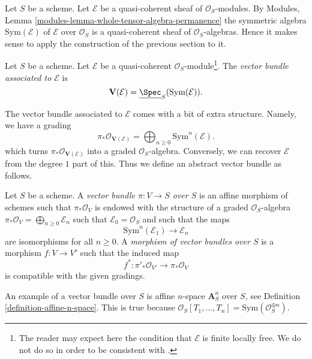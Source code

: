 \noindent
Let $S$ be a scheme.
Let $\mathcal{E}$ be a quasi-coherent sheaf of $\mathcal{O}_S$-modules.
By Modules, Lemma \ref{modules-lemma-whole-tensor-algebra-permanence}
the symmetric algebra $\text{Sym}(\mathcal{E})$ of
$\mathcal{E}$ over $\mathcal{O}_S$
is a quasi-coherent sheaf of $\mathcal{O}_S$-algebras.
Hence it makes sense to apply the construction of the
previous section to it.

\begin{definition}
\label{definition-vector-bundle}
Let $S$ be a scheme. Let $\mathcal{E}$ be a quasi-coherent
$\mathcal{O}_S$-module\footnote{The reader may expect here
the condition that $\mathcal{E}$ is finite locally free. We do not
do so in order to be consistent with \cite[II, Definition 1.7.8]{EGA}.}.
The {\it vector bundle associated to $\mathcal{E}$} is
$$
\mathbf{V}(\mathcal{E}) = \underline{\Spec}_S(\text{Sym}(\mathcal{E})).
$$
\end{definition}

\noindent
The vector bundle associated to $\mathcal{E}$ comes with a bit
of extra structure. Namely, we have a grading
$$
\pi_*\mathcal{O}_{\mathbf{V}(\mathcal{E})} =
\bigoplus\nolimits_{n \geq 0} \text{Sym}^n(\mathcal{E}).
$$
which turns $\pi_*\mathcal{O}_{\mathbf{V}(\mathcal{E})}$
into a graded $\mathcal{O}_S$-algebra. Conversely, we can recover
$\mathcal{E}$ from the degree $1$ part of this.
Thus we define an abstract vector bundle as follows.

\begin{definition}
\label{definition-abstract-vector-bundle}
Let $S$ be a scheme. A {\it vector bundle $\pi : V \to S$ over $S$} is an
affine morphism of schemes such that $\pi_*\mathcal{O}_V$ is endowed with
the structure of a graded $\mathcal{O}_S$-algebra
$\pi_*\mathcal{O}_V = \bigoplus\nolimits_{n \geq 0} \mathcal{E}_n$
such that $\mathcal{E}_0 = \mathcal{O}_S$ and such that the maps
$$
\text{Sym}^n(\mathcal{E}_1) \longrightarrow \mathcal{E}_n
$$
are isomorphisms for all $n \geq 0$. A {\it morphism of vector bundles
over $S$} is a morphism $f : V \to V'$ such that the induced map
$$
f^* : \pi'_*\mathcal{O}_{V'} \longrightarrow \pi_*\mathcal{O}_V
$$
is compatible with the given gradings.
\end{definition}

\noindent
An example of a vector bundle over $S$ is affine $n$-space
$\mathbf{A}^n_S$ over $S$, see Definition \ref{definition-affine-n-space}.
This is true because
$\mathcal{O}_S[T_1, \ldots, T_n] = \text{Sym}(\mathcal{O}_S^{\oplus n})$.

